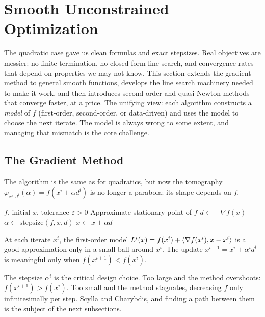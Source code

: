 \section{Smooth Unconstrained Optimization}\label{sec:smooth-methods}

The quadratic case gave us clean formulas and exact stepsizes.
Real objectives are messier: no finite termination, no closed-form line search, and convergence rates that depend on properties we may not know.
This section extends the gradient method to general smooth functions, develops the line search machinery needed to make it work, and then introduces second-order and quasi-Newton methods that converge faster, at a price.
The unifying view: each algorithm constructs a \emph{model} of $f$ (first-order, second-order, or data-driven) and uses the model to choose the next iterate.
The model is always wrong to some extent, and managing that mismatch is the core challenge.


\subsection{The Gradient Method}\label{sec:gradient-general}

The algorithm is the same as for quadratics, but now the tomography $\varphi_{x^i, d^i}(\alpha) = f(x^i + \alpha d^i)$ is no longer a parabola: its shape depends on $f$.

\begin{algorithm}
	\caption{Gradient Method with Steepest Descent}
	\begin{algorithmic}[1]
		\Require $f$, initial $x$, tolerance $\varepsilon > 0$
		\Ensure Approximate stationary point of $f$
				\State $d \gets -\nabla f(x)$
				\State $\alpha \gets \mathrm{stepsize}(f, x, d)$
				\State $x \gets x + \alpha d$
			\EndWhile
		\EndProcedure
	\end{algorithmic}
\end{algorithm}

At each iterate $x^i$, the first-order model $L^i(x) = f(x^i) + \langle\nabla f(x^i), x - x^i\rangle$ is a good approximation only in a small ball around $x^i$.
The update $x^{i+1} = x^i + \alpha^i d^i$ is meaningful only when $f(x^{i+1}) < f(x^i)$.

The stepsize $\alpha^i$ is the critical design choice.
Too large and the method overshoots: $f(x^{i+1}) > f(x^i)$.
Too small and the method stagnates, decreasing $f$ only infinitesimally per step.
Scylla and Charybdis, and finding a path between them is the subject of the next subsections.

